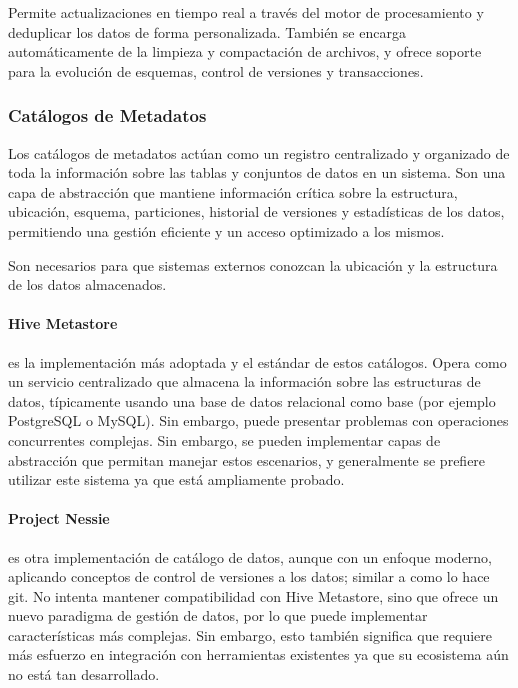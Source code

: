 Permite actualizaciones en tiempo real a través del motor de procesamiento y deduplicar los datos de forma personalizada. 
También se encarga automáticamente de la limpieza y compactación de archivos, 
y ofrece soporte para la evolución de esquemas, control de versiones y transacciones.

\newpage

\subsubsection{Catálogos de Metadatos}
Los catálogos de metadatos actúan como un registro centralizado y organizado de toda la información sobre las tablas y conjuntos de datos en un sistema. 
Son una capa de abstracción que mantiene información crítica sobre la estructura, ubicación, esquema, particiones, historial de versiones y estadísticas de los datos, 
permitiendo una gestión eficiente y un acceso optimizado a los mismos.\newline

Son necesarios para que sistemas externos conozcan la ubicación y la estructura de los datos almacenados. 

\paragraph{Hive Metastore} es la implementación más adoptada y el estándar de estos catálogos. Opera como un servicio centralizado que almacena la información sobre las estructuras de datos,
típicamente usando una base de datos relacional como base (por ejemplo PostgreSQL o MySQL). Sin embargo, puede presentar problemas con operaciones concurrentes complejas. 
Sin embargo, se pueden implementar capas de abstracción que permitan manejar estos escenarios, y generalmente se prefiere utilizar este sistema ya que está ampliamente probado.

\paragraph{Project Nessie} es otra implementación de catálogo de datos, aunque con un enfoque moderno, aplicando conceptos de control de versiones a los datos; similar a como lo hace git. 
No intenta mantener compatibilidad con Hive Metastore, sino que ofrece un nuevo paradigma de gestión de datos, por lo que puede implementar características más complejas. 
Sin embargo, esto también significa que requiere más esfuerzo en integración con herramientas existentes ya que su ecosistema aún no está tan desarrollado.

